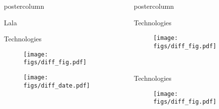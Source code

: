 \begin{frame}
\begin{columns}
\begin{column}{.42\textwidth}
\begin{beamercolorbox}[center]{postercolumn}
\begin{minipage}{.98\textwidth}
{\begin{myblock}{Lala}
					\end{myblock}\vfill
					\vspace{-0.3em}
					\begin{myblock}{Technologies}
						\vspace{0.75em}
						\begin{minipage}{.28\textwidth}
							\begin{figure}
								\texttt{[image: figs/diff\_fig.pdf]}
							\end{figure}
							\begin{figure}
								\texttt{[image: figs/diff\_date.pdf]}
							\end{figure}
						\end{minipage}
					\end{myblock}\vfill
		}\end{minipage}\end{beamercolorbox}
	\end{column}
	\begin{column}{.59\textwidth}
		\begin{beamercolorbox}[center]{postercolumn}
			\begin{minipage}{.98\textwidth} %
				\parbox[t][\columnheight]{\textwidth}{ %
					\begin{myblock}{Technologies}
						\vspace{0.75em}
						\begin{minipage}{.28\textwidth}
							\begin{figure}
								\texttt{[image: figs/diff\_fig.pdf]}
							\end{figure}
						\end{minipage}~
						\begin{minipage}{.68\textwidth}
						\end{minipage}
					\end{myblock}\vfill
					\begin{myblock}{Technologies}
						\vspace{0.75em}
						\begin{minipage}{.28\textwidth}
							\begin{figure}
								\texttt{[image: figs/diff\_fig.pdf]}
							\end{figure}
						\end{minipage}~
						\begin{minipage}{.68\textwidth}
						\end{minipage}
					\end{myblock}\vfill
		}\end{minipage}\end{beamercolorbox}
	\end{column}
\end{columns}
\end{frame}

